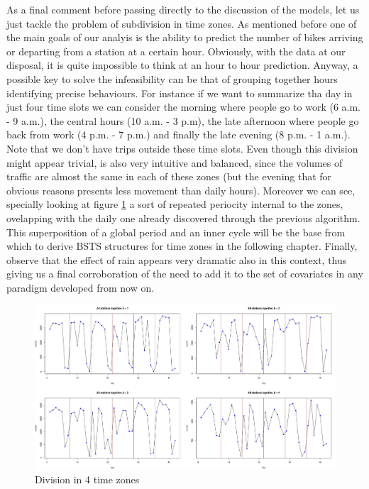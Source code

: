 \documentclass[11pt,twoside]{report}
\begin{document}
As a final comment before passing directly to the discussion of the models, let us just tackle the problem of subdivision in time zones. As mentioned before one of the main goals of our analyis is the ability to predict the number of bikes arriving or departing from a station at a certain hour. Obviously, with the data at our disposal, it is quite impossible to think at an hour to hour prediction. Anyway, a possible key to solve the infeasibility can be that of grouping together hours identifying precise behaviours. For instance if we want to summarize tha day in just four time slots we can consider the morning where people go to work (6 a.m. - 9 a.m.), the central hours (10 a.m. - 3 p.m), the late afternoon where people go back from work (4 p.m. - 7 p.m.) and finally the late evening (8 p.m. - 1 a.m.). Note that we don't have trips outside these time slots. Even though this division might appear trivial, is also very intuitive and balanced, since the volumes of traffic are almost the same in each of these zones (but the evening that for obvious reasons presents less movement than daily hours). Moreover we can see, specially looking at figure \ref{fig:tz} a sort of repeated periocity internal to the zones, ovelapping with the daily one already discovered through the previous algorithm. This superposition of a global period and an inner cycle will be the base from which to derive BSTS structures for time zones in the following chapter. Finally, observe that the effect of rain appears very dramatic also in this context, thus giving us a final corroboration of the need to add it to the set of covariates in any paradigm developed from now on.


\newpage
\begin{figure}[H]
	\centering
	\includegraphics[width=160 mm]{pictures/division.png}
	\caption{Division in 4 time zones}
	\label{fig:tz}
\end{figure}
\end{document}
